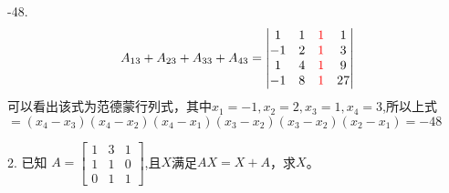 \documentclass{article}
\begin{document}
\begin{jie}
-48.
\begin{align*}
A_{13}+A_{23}+A_{33}+A_{43}=
\begin{vmatrix}
  1 & 1 & \textcolor[rgb]{1.00,0.00,0.00}{1} & 1 \\
  -1 & 2 & \textcolor[rgb]{1.00,0.00,0.00}{1} & 3 \\
  1 & 4 & \textcolor[rgb]{1.00,0.00,0.00}{1} & 9 \\
  -1 & 8 & \textcolor[rgb]{1.00,0.00,0.00}{1} & 27
\end{vmatrix}
\end{align*}
可以看出该式为范德蒙行列式，其中$x_1=-1,x_2=2,x_3=1,x_4=3$,所以上式$=(x_4-x_3)(x_4-x_2)(x_4-x_1)(x_3-x_2)(x_3-x_2)(x_2-x_1)=-48$
\end{jie}

2. 已知
$
A=
\begin{bmatrix}
  1 & 3 & 1 \\
  1 & 1 & 0\\
  0 & 1 & 1
\end{bmatrix}
$,且$X$满足$AX=X+A$，求$X$。
\end{document}
